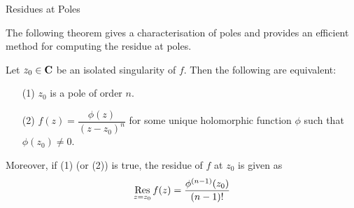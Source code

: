 \begin{mdframed}
\begin{center}
{\Large Residues at Poles}
\end{center}
\end{mdframed}
The following theorem gives a characterisation of poles and provides an efficient method for computing the residue at poles.
\begin{theorem}\label{poleorder}
Let $z_0 \in \mathbf C$ be an isolated singularity of $f$. Then the following are equivalent:
\begin{itemize}
\item[(1)] $z_0$ is a pole of order $n$.
\item[(2)] $f(z) = \dfrac{\phi(z)}{(z - z_0)^n}$ for some unique holomorphic function $\phi$ such that $\phi(z_0) \neq 0$.
\end{itemize}
Moreover, if (1) (or (2)) is true, the residue of $f$ at $z_0$ is given as
\[\underset{z = {z_0}}{\operatorname{Res}}\,f(z) = \frac{\phi^{(n-1)}(z_0)}{(n-1)!}\]
\end{theorem}
